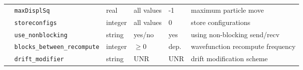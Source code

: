 \begin{table}[h]
\begin{center}
\begin{tabularx}{\textwidth}{l l l l l X }
   &   \texttt{maxDisplSq      } &  real  & all values & -1   & maximum particle move  \\
   &   \texttt{storeconfigs        } &  integer  & all values & 0   & store configurations  \\
   &   \texttt{use\_nonblocking    } &  string  & yes/no & yes   & using non-blocking send/recv \\
   &   \texttt{blocks\_between\_recompute} &  integer  & $\ge 0$ & dep.  & wavefunction recompute frequency  \\
   &   \texttt{drift\_modifier} &  string  & UNR & UNR  & drift modification scheme  \\
  \hline
\end{tabularx}
\end{center}
\end{table}

